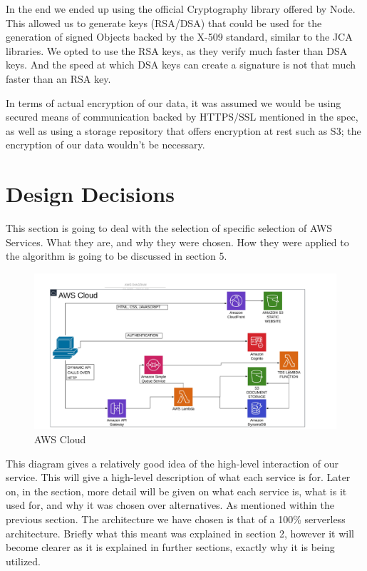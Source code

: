 \documentclass[runningheads]{llncs}
\begin{document}
In the end we ended up using the official Cryptography library offered by Node. This allowed us to generate keys (RSA/DSA) that could be used for the generation of signed Objects backed by the X-509 standard, similar to the JCA libraries. We opted to use the RSA keys, as they verify much faster than DSA keys. And the speed at which DSA keys can create a signature is not that much faster than an RSA key.

In terms of actual encryption of our data, it was assumed we would be using secured means of communication backed by HTTPS/SSL mentioned in the spec, as well as using a storage repository that offers encryption at rest such as S3; the encryption of our data wouldn't be necessary.

\section{Design Decisions}
This section is going to deal with the selection of specific selection of AWS Services. What they are, and why they were chosen. How they were applied to the algorithm is going to be discussed in section 5.

	\begin{figure}[H]
		\centering
		\includegraphics[width=12cm]{reportpics/11.jpg}  
		\caption{AWS Cloud}
		\label{AWS Cloud}
	\end{figure}

This diagram gives a relatively good idea of the high-level interaction of our service. This will give a high-level description of what each service is for. Later on, in the section, more detail will be given on what each service is, what is it used for, and why it was chosen over alternatives. As mentioned within the previous section. The architecture we have chosen is that of a 100\% serverless architecture. Briefly what this meant was explained in section 2, however it will become clearer as it is explained in further sections, exactly why it is being utilized.
\end{document}

